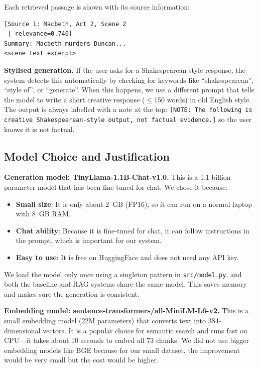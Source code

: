 \documentclass[10pt,conference]{IEEEtran}
\begin{document}
Each retrieved passage is shown with its source information:

\begin{lstlisting}[language={}]
[Source 1: Macbeth, Act 2, Scene 2
 | relevance=0.740]
Summary: Macbeth murders Duncan...
<scene text excerpt>
\end{lstlisting}

\textbf{Stylised generation.} If the user asks for a Shakespearean-style response, the system detects this automatically by checking for keywords like ``shakespearean'', ``style of'', or ``generate''. When this happens, we use a different prompt that tells the model to write a short creative response ($\leq$150 words) in old English style. The output is always labelled with a note at the top: \texttt{[NOTE: The following is creative Shakespearean-style output, not factual evidence.]} so the user knows it is not factual.

\subsection{Model Choice and Justification}

\textbf{Generation model: TinyLlama-1.1B-Chat-v1.0.} This is a 1.1 billion parameter model that has been fine-tuned for chat. We chose it because:
\begin{itemize}
    \item \textbf{Small size}: It is only about 2~GB (FP16), so it can run on a normal laptop with 8~GB RAM.
    \item \textbf{Chat ability}: Because it is fine-tuned for chat, it can follow instructions in the prompt, which is important for our system.
    \item \textbf{Easy to use}: It is free on HuggingFace and does not need any API key.
\end{itemize}

We load the model only once using a singleton pattern in \texttt{src/model.py}, and both the baseline and RAG systems share the same model. This saves memory and makes sure the generation is consistent.

\textbf{Embedding model: sentence-transformers/all-MiniLM-L6-v2.} This is a small embedding model (22M parameters) that converts text into 384-dimensional vectors. It is a popular choice for semantic search and runs fast on CPU---it takes about 10 seconds to embed all 73 chunks. We did not use bigger embedding models like BGE because for our small dataset, the improvement would be very small but the cost would be higher.
\end{document}
